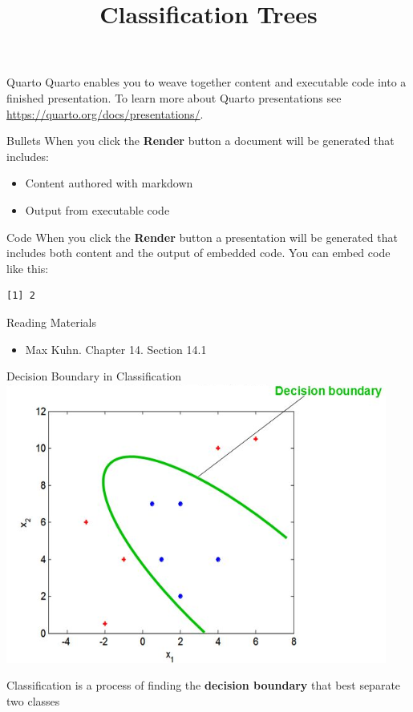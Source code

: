 \documentclass[
  ignorenonframetext,
]{beamer}
\title{Classification Trees}
\author{}
\date{}
\providecommand{\tightlist}{%
  \setlength{\itemsep}{0pt}\setlength{\parskip}{0pt}}\usepackage{longtable,booktabs,array}
\begin{document}
\frame{\titlepage}

\begin{frame}{Quarto}
\label{quarto}
Quarto enables you to weave together content and executable code into a
finished presentation. To learn more about Quarto presentations see
\url{https://quarto.org/docs/presentations/}.
\end{frame}

\begin{frame}{Bullets}
\label{bullets}
When you click the \textbf{Render} button a document will be generated
that includes:

\begin{itemize}
\tightlist
\item
  Content authored with markdown
\item
  Output from executable code
\end{itemize}
\end{frame}

\begin{frame}[fragile]{Code}
\label{code}
When you click the \textbf{Render} button a presentation will be
generated that includes both content and the output of embedded code.
You can embed code like this:

\begin{verbatim}
[1] 2
\end{verbatim}
\end{frame}

\begin{frame}{Reading Materials}
\label{reading-materials}
\begin{itemize}
\tightlist
\item
  Max Kuhn. Chapter 14. Section 14.1
\end{itemize}
\end{frame}

\begin{frame}{Decision Boundary in Classification}
\label{decision-boundary-in-classification}
\includegraphics{images/db.png}

Classification is a process of finding the \textbf{decision boundary}
that best separate two classes
\end{frame}
\end{document}
